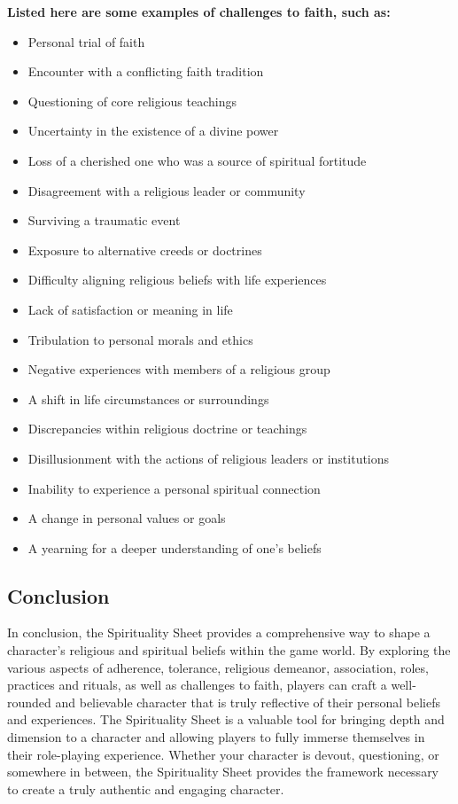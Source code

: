 \textbf{Listed here are some examples of challenges to faith, such as:}

\begin{itemize}
\tightlist
\item
  Personal trial of faith
\item
  Encounter with a conflicting faith tradition
\item
  Questioning of core religious teachings
\item
  Uncertainty in the existence of a divine power
\item
  Loss of a cherished one who was a source of spiritual fortitude
\item
  Disagreement with a religious leader or community
\item
  Surviving a traumatic event
\item
  Exposure to alternative creeds or doctrines
\item
  Difficulty aligning religious beliefs with life experiences
\item
  Lack of satisfaction or meaning in life
\item
  Tribulation to personal morals and ethics
\item
  Negative experiences with members of a religious group
\item
  A shift in life circumstances or surroundings
\item
  Discrepancies within religious doctrine or teachings
\item
  Disillusionment with the actions of religious leaders or institutions
\item
  Inability to experience a personal spiritual connection
\item
  A change in personal values or goals
\item
  A yearning for a deeper understanding of one's beliefs
\end{itemize}

\hypertarget{conclusion-1}{%
\subsection{Conclusion}\label{conclusion-1}}

In conclusion, the Spirituality Sheet provides a comprehensive way to
shape a character's religious and spiritual beliefs within the game
world. By exploring the various aspects of adherence, tolerance,
religious demeanor, association, roles, practices and rituals, as well
as challenges to faith, players can craft a well-rounded and believable
character that is truly reflective of their personal beliefs and
experiences. The Spirituality Sheet is a valuable tool for bringing
depth and dimension to a character and allowing players to fully immerse
themselves in their role-playing experience. Whether your character is
devout, questioning, or somewhere in between, the Spirituality Sheet
provides the framework necessary to create a truly authentic and
engaging character.

